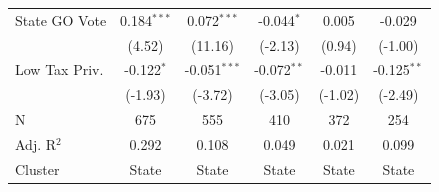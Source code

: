 \begin{tabular*}{\textwidth}{@{\extracolsep{\fill}}lccccc}
   State GO Vote        & 0.184$^{***}$  & 0.072$^{***}$  & -0.044$^{*}$   & 0.005         & -0.029\\   
                        & (4.52)        & (11.16)       & (-2.13)       & (0.94)       & (-1.00)\\   
   Low Tax Priv.        & -0.122$^{*}$   & -0.051$^{***}$ & -0.072$^{**}$  & -0.011        & -0.125$^{**}$\\   
                        & (-1.93)       & (-3.72)       & (-3.05)       & (-1.02)      & (-2.49)\\   
   \hline
   N         & 675            & 555            & 410            & 372           & 254\\  
   Adj. R$^2$       & 0.292          & 0.108          & 0.049          & 0.021         & 0.099\\  
   Cluster              & State & State & State & State & State\\  
   \bottomrule
\end{tabular*}
\par\endgroup
